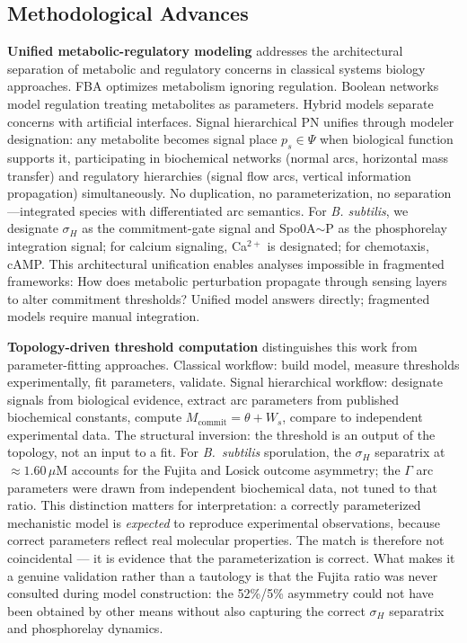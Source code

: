 \documentclass[10pt,letterpaper]{article}
\begin{document}
\subsection{Methodological Advances}

\textbf{Unified metabolic-regulatory modeling} addresses the architectural separation of metabolic and regulatory concerns in classical systems biology approaches. FBA optimizes metabolism ignoring regulation. Boolean networks model regulation treating metabolites as parameters. Hybrid models separate concerns with artificial interfaces. Signal hierarchical PN unifies through modeler designation: any metabolite becomes signal place $p_s \in \Psi$ when biological function supports it, participating in biochemical networks (normal arcs, horizontal mass transfer) and regulatory hierarchies (signal flow arcs, vertical information propagation) simultaneously. No duplication, no parameterization, no separation---integrated species with differentiated arc semantics. For \textit{B. subtilis}, we designate $\sigma_H$ as the commitment-gate signal and Spo0A$\sim$P as the phosphorelay integration signal; for calcium signaling, Ca$^{2+}$ is designated; for chemotaxis, cAMP. This architectural unification enables analyses impossible in fragmented frameworks: How does metabolic perturbation propagate through sensing layers to alter commitment thresholds? Unified model answers directly; fragmented models require manual integration.

\textbf{Topology-driven threshold computation} distinguishes this work from parameter-fitting approaches. Classical workflow: build model, measure thresholds experimentally, fit parameters, validate. Signal hierarchical workflow: designate signals from biological evidence, extract arc parameters from published biochemical constants, compute $M_{\text{commit}} = \theta + W_s$, compare to independent experimental data. The structural inversion: the threshold is an output of the topology, not an input to a fit. For \textit{B.\ subtilis} sporulation, the $\sigma_H$ separatrix at $\approx 1.60\,\mu$M accounts for the Fujita and Losick outcome asymmetry; the $\Gamma$ arc parameters were drawn from independent biochemical data, not tuned to that ratio. This distinction matters for interpretation: a correctly parameterized mechanistic model is \textit{expected} to reproduce experimental observations, because correct parameters reflect real molecular properties. The match is therefore not coincidental --- it is evidence that the parameterization is correct. What makes it a genuine validation rather than a tautology is that the Fujita ratio was never consulted during model construction: the 52\%/5\% asymmetry could not have been obtained by other means without also capturing the correct $\sigma_H$ separatrix and phosphorelay dynamics.
\end{document}
